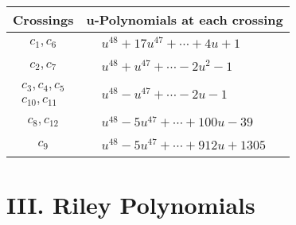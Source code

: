 \documentclass[1p]{elsarticle_modified}
\theoremstyle{definition}
\begin{document}
\begin{tabular}{m{50pt}|m{274pt}}
Crossings & \hspace{64pt}u-Polynomials at each crossing \\
\hline $$\begin{aligned}c_{1},c_{6}\end{aligned}$$&$\begin{aligned}
&u^{48}+17 u^{47}+\cdots+4 u+1
\end{aligned}$\\
\hline $$\begin{aligned}c_{2},c_{7}\end{aligned}$$&$\begin{aligned}
&u^{48}+u^{47}+\cdots-2 u^2-1
\end{aligned}$\\
\hline $$\begin{aligned}c_{3},c_{4},c_{5}\\c_{10},c_{11}\end{aligned}$$&$\begin{aligned}
&u^{48}- u^{47}+\cdots-2 u-1
\end{aligned}$\\
\hline $$\begin{aligned}c_{8},c_{12}\end{aligned}$$&$\begin{aligned}
&u^{48}-5 u^{47}+\cdots+100 u-39
\end{aligned}$\\
\hline $$\begin{aligned}c_{9}\end{aligned}$$&$\begin{aligned}
&u^{48}-5 u^{47}+\cdots+912 u+1305
\end{aligned}$\\
\hline
\end{tabular}\newpage\renewcommand{\arraystretch}{1}
\centering \section*{ III. Riley Polynomials}
\end{document}
